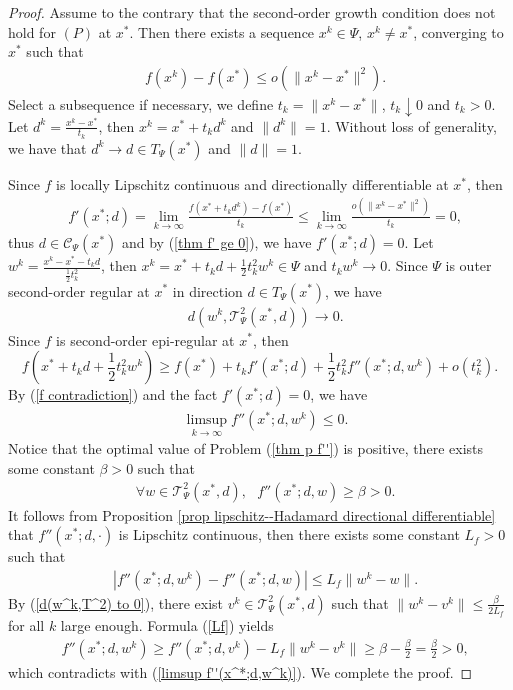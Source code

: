 \documentclass[10pt,a4paper]{amsart}
\begin{document}
\begin{proof}
 Assume to the contrary that the second-order growth condition does not hold for $(P)$ at $x^*$.
  Then there exists a sequence $x^k\in \Psi$, $x^k\neq x^*$, converging to $x^*$ such that
\begin{align}\label{f contradiction}
  & f(x^k)-f(x^*)\le o(\|x^k-x^*\|^2).
\end{align}
  Select a subsequence if necessary, we define $t_k=\|x^k-x^*\|$, $t_k\downarrow 0$ and $t_k>0$. Let
$d^k=\frac{x^k-x^*}{t_k}$, then $x^k=x^*+t_k d^k$ and $\|d^k\|=1$. Without loss of generality, we have that $d^k\to d\in T_{\Psi}(x^*) $
and $\|d\|=1$.

Since $f$ is locally Lipschitz continuous and directionally differentiable at $x^*$,
then
\begin{align*}
   & f'(x^*;d)=\lim_{k\to \infty}\frac{f(x^*+t_k d^k)-f(x^*)}{t_k}
   \le \lim_{k\to \infty}\frac{o(\|x^k-x^*\|^2)}{t_k}=0,
\end{align*}
thus $d\in \mathcal{C}_{\Psi}(x^*)$ and by (\ref{thm f' ge 0}), we have $f'(x^*;d)=0$.
Let $w^k=\frac{x^k-x^*-t_k d}{\frac{1}{2}t_k^2}$, then $x^k=x^*+t_k d+\frac{1}{2}t_k^2w^k\in \Psi$ and $t_kw^k\to
0$. Since $\Psi$ is outer second-order regular
at $x^*$ in  direction $d\in T_{\Psi}(x^*)$, we have
 \begin{align}\label{d(w^k,T^2) to 0}
   &d(w^k,\mathcal{T}^2_{\Psi}(x^*,d))\to 0.
 \end{align}
  Since $f$ is second-order  epi-regular at $x^*$, then
 $$f(x^*+t_k d+\frac{1}{2}t_k^2w^k) \ge f(x^*)+t_k f'(x^*;d)+\frac{1}{2}t_k^2 f''(x^*;d,w^k)+o(t_k^2).$$
 By
 (\ref{f contradiction}) and the fact $f'(x^*;d)=0$, we have
 \begin{align}\label{limsup f''(x^*;d,w^k)}
   & \limsup_{k\to \infty}f''(x^*;d,w^k)\le 0.
 \end{align}
 Notice that the optimal value of Problem (\ref{thm p f''}) is positive,
 there exists some constant $\beta>0$ such that
 \begin{align*}
    & \forall w\in \mathcal{T}^2_{\Psi}(x^*,d),~~~f''(x^*;d,w)\ge \beta >0.
 \end{align*}
It follows from Proposition \ref{prop lipschitz--Hadamard directional differentiable} that $f''(x^*;d,\cdot)$ is
Lipschitz continuous, then there exists some constant $L_f>0$ such that
\begin{align}\label{Lf}
   & |f''(x^*;d,w^k)-f''(x^*;d,w)|\le L_{f}\|w^k-w\|.
\end{align}
By (\ref{d(w^k,T^2) to 0}), there exist $v^k\in \mathcal{T}^2_{\Psi}(x^*,d)$ such that $\|w^k-v^k\|\le
\frac{\beta}{2L_f}$ for all $k$ large enough.
Formula (\ref{Lf}) yields
\begin{align*}
   & f''(x^*;d,w^k)\ge f''(x^*;d,v^k)-L_f\|w^k-v^k\|\ge \beta-\frac{\beta}{2}=\frac{\beta}{2}>0,
\end{align*}
 which contradicts with (\ref{limsup f''(x^*;d,w^k)}). We complete the proof.
\end{proof}
\end{document}
